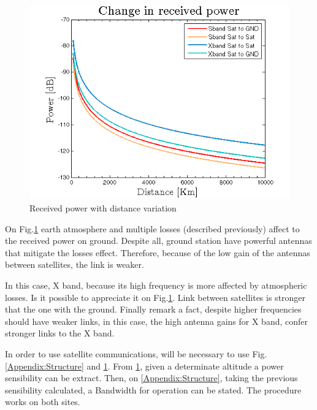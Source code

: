 \begin{figure}[h]
\includegraphics[scale=0.9]{./sections/SatelliteDept/sections/images/friisCases}
\centering
\caption{Received power with distance variation}
\label{friis}
\end{figure}

On Fig.\ref{friis} earth atmosphere and multiple losses (described previously) affect to the received power on ground. Despite all, ground station have powerful antennas that mitigate the losses effect. Therefore, because of the low gain of the antennas between satellites, the link is weaker.

In this case, X band, because its high frequency is more affected by atmospheric losses. Is it possible to appreciate it on Fig.\ref{friis}. Link between satellites is stronger that the one with the ground. Finally remark a fact, despite higher frequencies should have weaker links, in this case, the high antenna gains for X band, confer stronger links to the X band.

In order to use satellite communications, will be necessary to use Fig.\ref{Appendix:Structure} and \ref{friis}. From \ref{friis}, given a determinate altitude a power sensibility can be extract. Then, on \ref{Appendix:Structure}, taking the previous sensibility calculated, a Bandwidth for operation can be stated. The procedure works on both sites.